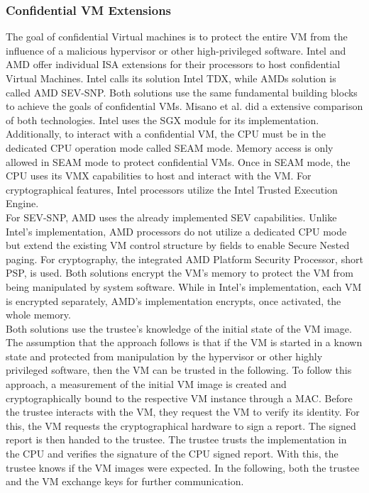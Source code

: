 \subsubsection{Confidential VM Extensions}
\label{section:20:confidential_vms}
The goal of confidential Virtual machines is to protect the entire VM from the
influence of a malicious hypervisor or other high-privileged software. Intel and
AMD offer individual ISA extensions for their processors to host confidential
Virtual Machines. Intel calls its solution Intel TDX, while AMDs solution is
called AMD SEV-SNP.\cite{tdx_whitepaper,kaplan_amd_2020} Both solutions use the
same fundamental building blocks to achieve the goals of confidential VMs.
Misano et al. did a extensive comparison of both
technologies.\cite{misono_confidential_2024} Intel uses the SGX module for its
implementation. Additionally, to interact with a confidential VM, the CPU must
be in the dedicated CPU operation mode called SEAM mode. Memory access is only
allowed in SEAM mode to protect confidential VMs. Once in SEAM mode, the CPU
uses its VMX capabilities to host and interact with the VM. For cryptographical
features, Intel processors utilize the Intel Trusted Execution Engine.\\

For SEV-SNP, AMD uses the already implemented SEV capabilities. Unlike Intel's
implementation, AMD processors do not utilize a dedicated CPU mode but extend
the existing VM control structure by fields to enable Secure Nested paging. For
cryptography, the integrated AMD Platform Security Processor, short PSP, is
used. Both solutions encrypt the VM's memory to protect the VM from being
manipulated by system software. While in Intel's implementation, each VM is
encrypted separately, AMD's implementation encrypts, once activated, the whole
memory.\\

Both solutions use the trustee's knowledge of the initial state of the VM image.
The assumption that the approach follows is that if the VM is started in a known
state and protected from manipulation by the hypervisor or other highly
privileged software, then the VM can be trusted in the following. To follow this
approach, a measurement of the initial VM image is created and cryptographically
bound to the respective VM instance through a MAC. Before the trustee interacts
with the VM, they request the VM to verify its identity. For this, the VM
requests the cryptographical hardware to sign a report. The signed report is
then handed to the trustee. The trustee trusts the implementation in the CPU and
verifies the signature of the CPU signed report. With this, the trustee knows if
the VM images were expected. In the following, both the trustee and the VM
exchange keys for further communication.\\

